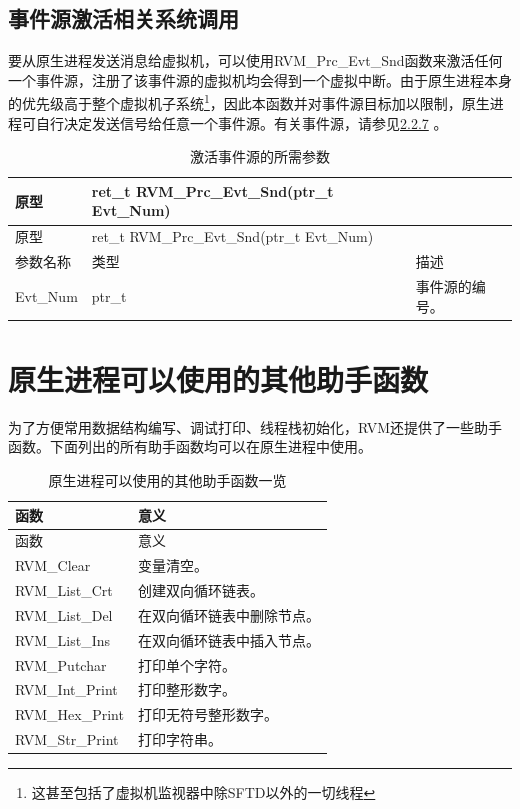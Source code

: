 \subsection{事件源激活相关系统调用}\label{subsec:3-5-8}

要从原生进程发送消息给虚拟机，可以使用RVM\_Prc\_Evt\_Snd函数来激活任何一个事件源，注册了该事件源的虚拟机均会得到一个虚拟中断。由于原生进程本身的优先级高于整个虚拟机子系统\footnote{这甚至包括了虚拟机监视器中除SFTD以外的一切线程}，因此本函数并对事件源目标加以限制，原生进程可自行决定发送信号给任意一个事件源。有关事件源，请参见\protect\hyperref[subsec:2-2-7]{2.2.7}
。

\begin{xltabular}{\textwidth}{@{}>{\hsize\raggedright\arraybackslash}X>{\hsize\raggedright\arraybackslash}X>{\hsize\raggedright\arraybackslash}X@{}}
\caption{激活事件源的所需参数}\label{tab:3-12}\\
\toprule
原型 & ret\_\allowbreak{}t RVM\_\allowbreak{}Prc\_\allowbreak{}Evt\_\allowbreak{}Snd(ptr\_\allowbreak{}t Evt\_\allowbreak{}Num) &\tabularnewline
\endfirsthead
\toprule
原型 & ret\_\allowbreak{}t RVM\_\allowbreak{}Prc\_\allowbreak{}Evt\_\allowbreak{}Snd(ptr\_\allowbreak{}t Evt\_\allowbreak{}Num) &\tabularnewline
\midrule
\endhead
\bottomrule
\endlastfoot
参数名称 & 类型 & 描述\tabularnewline
Evt\_\allowbreak{}Num & ptr\_\allowbreak{}t & 事件源的编号。\tabularnewline
\end{xltabular}

\section{原生进程可以使用的其他助手函数}\label{sec:3-6}

为了方便常用数据结构编写、调试打印、线程栈初始化，RVM还提供了一些助手函数。下面列出的所有助手函数均可以在原生进程中使用。

\begin{xltabular}{\textwidth}{@{}>{\hsize\raggedright\arraybackslash}X>{\hsize\raggedright\arraybackslash}X@{}}
\caption{原生进程可以使用的其他助手函数一览}\label{tab:3-13}\\
\toprule
函数 & 意义\tabularnewline
\endfirsthead
\toprule
函数 & 意义\tabularnewline
\midrule
\endhead
\bottomrule
\endlastfoot
RVM\_\allowbreak{}Clear & 变量清空。\tabularnewline
RVM\_\allowbreak{}List\_\allowbreak{}Crt & 创建双向循环链表。\tabularnewline
RVM\_\allowbreak{}List\_\allowbreak{}Del & 在双向循环链表中删除节点。\tabularnewline
RVM\_\allowbreak{}List\_\allowbreak{}Ins & 在双向循环链表中插入节点。\tabularnewline
RVM\_\allowbreak{}Putchar & 打印单个字符。\tabularnewline
RVM\_\allowbreak{}Int\_\allowbreak{}Print & 打印整形数字。\tabularnewline
RVM\_\allowbreak{}Hex\_\allowbreak{}Print & 打印无符号整形数字。\tabularnewline
RVM\_\allowbreak{}Str\_\allowbreak{}Print & 打印字符串。\tabularnewline
\end{xltabular}

